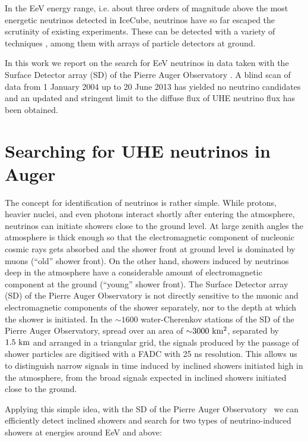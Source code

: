 \documentclass[reprint,showpacs,showkeys,amsmath,amssymb,aps,nofootinbib]{revtex4-1}
\begin{document}
In the EeV energy range, i.e. about three orders of magnitude above the most energetic 
neutrinos detected in IceCube, neutrinos 
have so far escaped the scrutinity of existing experiments. 
These can be detected with a variety of techniques \cite{Veronique},
among them with arrays of particle detectors at ground.

In this work we report on the search for EeV neutrinos in data taken 
with the Surface Detector array (SD) of the Pierre Auger Observatory \cite{Auger_SD}. 
A blind scan of data from 1 January 2004 up to 20 June 2013 has yielded no neutrino 
candidates and an updated and stringent limit to the diffuse flux of UHE neutrino flux
has been obtained. 

\section{Searching for UHE neutrinos in Auger}

The concept for identification of neutrinos is rather simple.
While protons, heavier nuclei, and even photons interact shortly
after entering the atmosphere, neutrinos can initiate showers close to the ground 
level. At large zenith angles the atmosphere is thick enough 
so that the electromagnetic component of nucleonic cosmic rays 
gets absorbed and the shower front at ground level is dominated by muons  
(``old'' shower front). On the other hand, showers induced
by neutrinos deep in the atmosphere have a considerable amount of electromagnetic 
component at the ground (``young'' shower front).
The Surface Detector array (SD) of the Pierre Auger Observatory is not directly sensitive 
to the muonic and electromagnetic components of the shower separately, nor 
to the depth at which the shower is initiated.  
In the ${\sim} 1600$ 
water-Cherenkov stations of the SD of the Pierre Auger Observatory, spread over
an area of ${\sim} 3000~{\rm km^2}$, separated by $1.5~{\rm km}$ 
and arranged in a triangular grid, the signals produced by the 
passage of shower particles are digitised with a FADC with 25 ns resolution. 
This allows us to distinguish narrow signals 
in time induced by inclined showers initiated high in the atmosphere, 
from the broad signals expected in inclined showers initiated close to the ground.

Applying this simple idea, with the SD of the Pierre Auger Observatory~\cite{Auger_SD} 
we can efficiently detect inclined showers and search for two types of neutrino-induced showers at energies 
around EeV and above:
\end{document}

